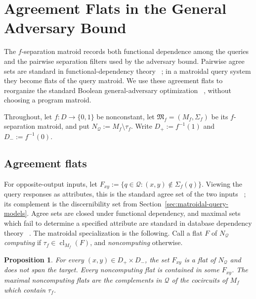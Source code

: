\documentclass[11pt]{article}
\numberwithin{equation}{section}
\newtheorem{proposition}[definition]{Proposition}
\theoremstyle{remark}
\newcommand{\cl}{\operatorname{cl}}
\begin{document}
\section{Agreement Flats in the General Adversary Bound}
\label{sec:flat-adversary}
\label{sec:source-adversary}

The $f$-separation matroid records both functional dependence among the
queries and the pairwise separation filters used by the adversary bound.
Pairwise agree sets are standard in functional-dependency theory
~\cite{GinsburgHull1983}; in a matroidal query system they become flats of
the query matroid. We use these agreement flats to reorganize the standard
Boolean general-adversary optimization
~\cite{HoyerLeeSpalek2007,LeeMittalReichardtSpalekSzegedy2011}, without
choosing a program matroid.

Throughout, let $f:D\to\{0,1\}$ be nonconstant, let
$\mathfrak M_f=(M_f,\Sigma_f)$ be its $f$-separation matroid, and put
$N_{\mathcal Q}:=M_f\setminus\tau_f$.  Write
$D_+:=f^{-1}(1)$ and $D_-:=f^{-1}(0)$.

\subsection{Agreement flats}
\label{subsec:agreement-flats}

For opposite-output inputs, let
$F_{xy}:=\{q\in\mathcal Q:(x,y)\notin\Sigma_f(q)\}$. Viewing the query
responses as attributes, this is the standard agree set of the two inputs
~\cite{GinsburgHull1983}; its complement is the discernibility set from
Section~\ref{sec:matroidal-query-models}. Agree sets are closed under
functional dependency, and maximal sets which fail to determine a specified
attribute are standard in database dependency theory
~\cite{LopesPetitLakhal2001}. The matroidal specialization is the following. Call a flat $F$ of $N_{\mathcal Q}$ \emph{computing} if $\tau_f\in\cl_{M_f}(F)$, and \emph{noncomputing} otherwise.

\begin{proposition}
\label{prop:agreement-set-flat}
\label{prop:noncomputing-flat-realized-above}
\label{prop:maximal-noncomputing-target-cocircuit}
For every $(x,y)\in D_+\times D_-$, the set $F_{xy}$ is a flat of
$N_{\mathcal Q}$ and does not span the target.  Every noncomputing flat is
contained in some $F_{xy}$.  The maximal noncomputing flats are the
complements in $\mathcal Q$ of the cocircuits of $M_f$ which contain
$\tau_f$.
\end{proposition}
\end{document}
